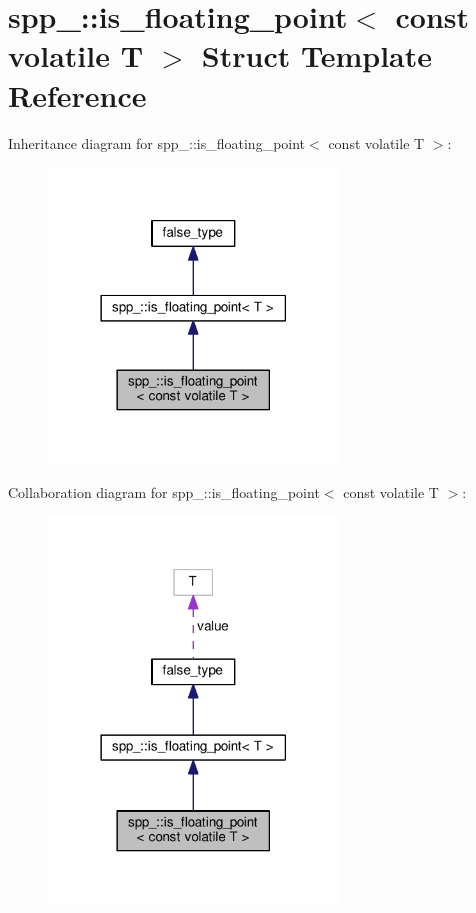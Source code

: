 \hypertarget{structspp___1_1is__floating__point_3_01const_01volatile_01_t_01_4}{}\section{spp\+\_\+\+:\+:is\+\_\+floating\+\_\+point$<$ const volatile T $>$ Struct Template Reference}
\label{structspp___1_1is__floating__point_3_01const_01volatile_01_t_01_4}


Inheritance diagram for spp\+\_\+\+:\+:is\+\_\+floating\+\_\+point$<$ const volatile T $>$\+:\nopagebreak
\begin{figure}[H]
\begin{center}
\leavevmode
\includegraphics[width=218pt]{structspp___1_1is__floating__point_3_01const_01volatile_01_t_01_4__inherit__graph}
\end{center}
\end{figure}


Collaboration diagram for spp\+\_\+\+:\+:is\+\_\+floating\+\_\+point$<$ const volatile T $>$\+:\nopagebreak
\begin{figure}[H]
\begin{center}
\leavevmode
\includegraphics[width=218pt]{structspp___1_1is__floating__point_3_01const_01volatile_01_t_01_4__coll__graph}
\end{center}
\end{figure}
